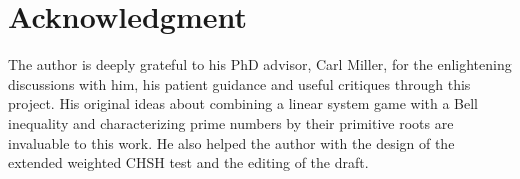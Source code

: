 \documentclass[11pt,letterpaper]{article}
\newcommand{\ket}[1]{|#1\rangle}
\newcommand{\ketbra}[2]{|#1\rangle\langle#2|}
\DeclareMathOperator{\Tr}{Tr}
\DeclareMathOperator{\supp}{supp}
\newcommand{\1}{\mathbb{1}}
\newcommand{\Pg}{\mathcal{P}}
\newcommand{\CHSH}{CHSH^{(d)}}
\newcommand{\tA}{\tilde{A}}
\newcommand{\tU}{\tilde{U}}
\theoremstyle{definition}
\begin{document}


\section*{Acknowledgment}
The author is deeply grateful to his PhD advisor, Carl Miller, for the enlightening discussions with him, his patient guidance and useful critiques through this
project. His original ideas about 
combining a linear system game with a Bell inequality and characterizing prime numbers
by their primitive roots are invaluable to
this work. He also helped the author with the design
of the extended weighted CHSH test
and the editing of the draft.



\appendix

\end{document}
